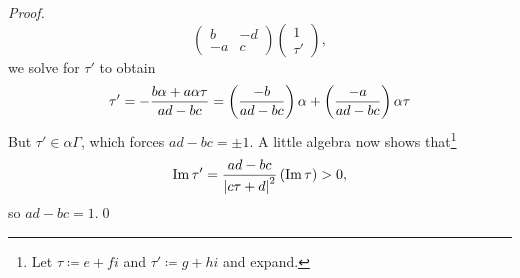 \documentclass[../Moduli_Spaces_of_Riemann_Surfaces.tex]{subfiles}
\begin{document}
\begin{proof}
\begin{equation*}
\begin{pmatrix}
                b & -d \\
                -a & c
            \end{pmatrix}
            \begin{pmatrix}
                1 \\ \tau'
            \end{pmatrix},
        \end{equation*}
        we solve for $\tau'$ to obtain
        \begin{equation*}
            \tau'=-\frac{b\alpha+a\alpha\tau}{ad-bc}=\left(\frac{-b}{ad-bc}\right)\alpha+\left(\frac{-a}{ad-bc}\right)\alpha\tau
        \end{equation*}
        But $\tau'\in\alpha\Gamma$, which forces $ad-bc=\pm1$. A little algebra now shows that\footnote{Let $\tau\coloneqq e+fi$ and $\tau'\coloneqq g+hi$ and expand.}
        \begin{equation*}
            \operatorname{Im}\tau'=\frac{ad-bc}{\left|c\tau+d\right|^2}\left(\operatorname{Im}\tau\right)>0,
        \end{equation*}
        so $ad-bc=1$.\qed
    \end{proof}
\end{document}
